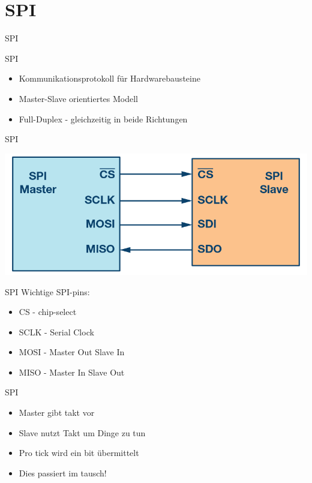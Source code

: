 \documentclass[aspectratio=169,presentation]{beamer}
\newcommand{\sectionframe}[1]{
	\begin{frame}
		\vfill
		\Huge
		\centering
		\usebeamercolor[fg]{title}
		#1
		\vfill
		\par
	\end{frame}
}
\begin{document}
\section{SPI}
\sectionframe{SPI}
\begin{frame} {SPI}
  \begin{itemize}
    \item Kommunikationsprotokoll für Hardwarebausteine
    \item Master-Slave orientiertes Modell
    \item Full-Duplex - gleichzeitig in beide Richtungen
  \end{itemize}
\end{frame}

\begin{frame} {SPI}
  \begin{center}
    \includegraphics[width=.8\textwidth]{SPI-single.png}
  \end{center}
\end{frame}

\begin{frame} {SPI}
  Wichtige SPI-pins:
  \begin{itemize}
    \item CS - chip-select
    \item SCLK - Serial Clock
    \item MOSI - Master Out Slave In
    \item MISO - Master In Slave Out
  \end{itemize}
\end{frame}

\begin{frame} {SPI}
  \begin{itemize}
    \item Master gibt takt vor
    \item Slave nutzt Takt um Dinge zu tun
    \item Pro tick wird ein bit übermittelt
    \item Dies passiert im tausch!
  \end{itemize}
\end{frame}
\end{document}
